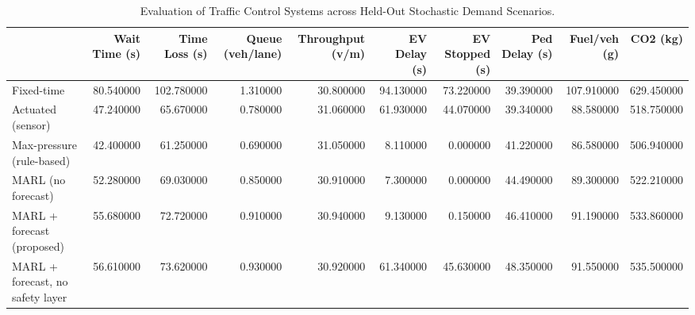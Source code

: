 \begin{table}[htbp]
\caption{Evaluation of Traffic Control Systems across Held-Out Stochastic Demand Scenarios.}
\label{tab:traffic_benchmarks}
\begin{tabular}{lrrrrrrrrr}
\toprule
 & Wait Time (s) & Time Loss (s) & Queue (veh/lane) & Throughput (v/m) & EV Delay (s) & EV Stopped (s) & Ped Delay (s) & Fuel/veh (g) & CO2 (kg) \\
\midrule
Fixed-time & 80.540000 & 102.780000 & 1.310000 & 30.800000 & 94.130000 & 73.220000 & 39.390000 & 107.910000 & 629.450000 \\
Actuated (sensor) & 47.240000 & 65.670000 & 0.780000 & 31.060000 & 61.930000 & 44.070000 & 39.340000 & 88.580000 & 518.750000 \\
Max-pressure (rule-based) & 42.400000 & 61.250000 & 0.690000 & 31.050000 & 8.110000 & 0.000000 & 41.220000 & 86.580000 & 506.940000 \\
MARL (no forecast) & 52.280000 & 69.030000 & 0.850000 & 30.910000 & 7.300000 & 0.000000 & 44.490000 & 89.300000 & 522.210000 \\
MARL + forecast (proposed) & 55.680000 & 72.720000 & 0.910000 & 30.940000 & 9.130000 & 0.150000 & 46.410000 & 91.190000 & 533.860000 \\
MARL + forecast, no safety layer & 56.610000 & 73.620000 & 0.930000 & 30.920000 & 61.340000 & 45.630000 & 48.350000 & 91.550000 & 535.500000 \\
\bottomrule
\end{tabular}
\end{table}
